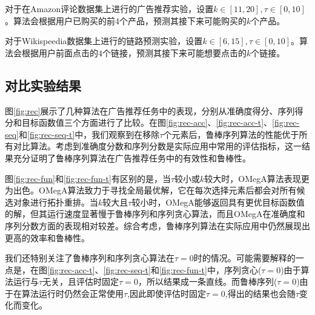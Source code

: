 对于在Amazon评论数据集上进行的广告推荐实验，设置$k\in[11,20],\tau \in[0,10]$。算法会根据用户已购买的前$4$个产品，预测其接下来可能购买的$k$个产品。

对于Wikispeedia数据集上进行的链路预测实验，设置$k\in[6,15],\tau \in[0,10]$。算法会根据用户前面点击的$4$个链接，预测其接下来可能想要点击的$k$个链接。


\subsection{对比实验结果}

图\ref{fig:rec}展示了几种算法在广告推荐任务中的表现，分别从准确度得分、序列得分和目标函数值三个方面进行了比较。在图\ref{fig:rec-acc}、\ref{fig:rec-acc-t}、\ref{fig:rec-seq}和\ref{fig:rec-seq-t}中，我们观察到在移除$\tau$个元素后，鲁棒序列算法的性能优于所有对比算法。考虑到准确度分数和序列分数是实际应用中常用的评估指标，这一结果充分证明了鲁棒序列算法在广告推荐任务中的有效性和鲁棒性。

图\ref{fig:rec-fun}和\ref{fig:rec-fun-t}有区别的是，当$\tau$较小或$k$较大时，OMegA算法表现更为出色。OMegA算法致力于寻找全局最优解，它在每次选择元素后都会对所有候选对象进行拓扑重排。当$k$较大且$\tau$较小时，OMegA能够返回具有更优目标函数值的解，但其运行速度显著慢于鲁棒序列和序列贪心算法，而且OMegA在准确度和序列分数方面的表现相对较差。综合考虑，鲁棒序列算法在实际应用中仍然展现出更高的效率和鲁棒性。

我们还特别关注了鲁棒序列和序列贪心算法在$\tau=0$时的情况。可能需要解释的一点是，在图\ref{fig:rec-acc-t}、\ref{fig:rec-seq-t}和\ref{fig:rec-fun-t}中，序列贪心($\tau=0$)由于算法运行与$\tau$无关，且评估时固定$\tau=0$，所以结果成一条直线。而鲁棒序列($\tau=0$)由于在算法运行时仍然会正常使用$\tau$,因此即使评估时固定$\tau=0$,得出的结果也会随$\tau$变化而变化。

